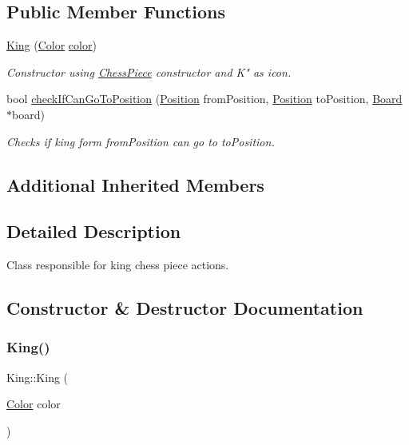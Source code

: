 \subsection*{Public Member Functions}
\begin{DoxyCompactItemize}
\item 
\hyperlink{classKing_a39c7835e28a746800a290c3fb6501c92}{King} (\hyperlink{Enums_8h_ab87bacfdad76e61b9412d7124be44c1c}{Color} \hyperlink{classChessPiece_a8c8fc170e7c719ac2b71a93a56a38f01}{color})
\begin{DoxyCompactList}\small\item\em Constructor using \hyperlink{classChessPiece}{Chess\+Piece} constructor and \textquotesingle{}K" as icon. \end{DoxyCompactList}\item 
bool \hyperlink{classKing_ab9e40ed32cfc93fec76a831d2087fa78}{check\+If\+Can\+Go\+To\+Position} (\hyperlink{classPosition}{Position} from\+Position, \hyperlink{classPosition}{Position} to\+Position, \hyperlink{classBoard}{Board} $\ast$board)
\begin{DoxyCompactList}\small\item\em Checks if king form from\+Position can go to to\+Position. \end{DoxyCompactList}\end{DoxyCompactItemize}
\subsection*{Additional Inherited Members}


\subsection{Detailed Description}
Class responsible for king chess piece actions. 

\subsection{Constructor \& Destructor Documentation}
\mbox{\label{classKing_a39c7835e28a746800a290c3fb6501c92}} 
\subsubsection{\texorpdfstring{King()}{King()}}
{\footnotesize\ttfamily King\+::\+King (\begin{DoxyParamCaption}\item[{\hyperlink{Enums_8h_ab87bacfdad76e61b9412d7124be44c1c}{Color}}]{color }\end{DoxyParamCaption})\hspace{0.3cm}{\ttfamily [inline]}}



